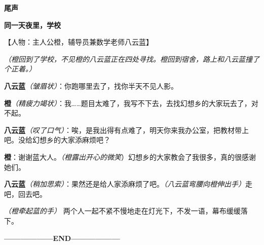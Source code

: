 \begin{center}
    \textbf{\large 尾声}
\end{center}

{\large \bfseries 同一天夜里，学校}

【人物：主人公橙，辅导员兼数学老师八云蓝】

\textit{（橙回到了学校，不见橙的八云蓝正在四处寻找。橙回到宿舍，路上和八云蓝撞了个正着。）}

\textbf{八云蓝}\textit{（皱眉状）}：你跑哪里去了，找你半天不见人影。

\textbf{橙}\textit{（精疲力竭状）}：我……题目太难了，我写不下去，去找幻想乡的大家玩去了，对不起。

\textbf{八云蓝}\textit{（叹了口气）}：唉，是我出得有点难了，明天你来我办公室，把教材带上吧。没给幻想乡的大家添麻烦吧？

\textbf{橙}：谢谢蓝大人。\textit{（橙露出开心的微笑}）幻想乡的大家教会了我很多，真的很感谢她们。

\textbf{八云蓝}\textit{（稍加思索）}：果然还是给人家添麻烦了吧。\textit{（八云蓝弯腰向橙伸出手）}走吧，回去吧。

\textit{（橙牵起蓝的手）
}
两个人一起不紧不慢地走在灯光下，不发一语，幕布缓缓落下。

\begin{center}
    \textbf{——————END——————}
\end{center}


